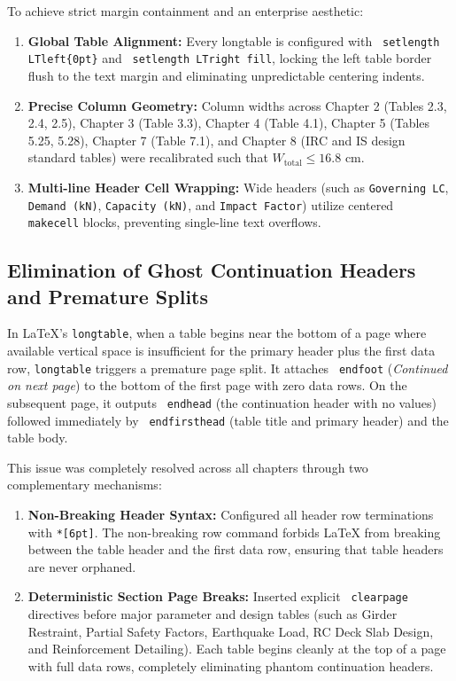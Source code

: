 \documentclass[12pt,a4paper]{article}
\begin{document}
To achieve strict margin containment and an enterprise aesthetic:
\begin{enumerate}
  \item \textbf{Global Table Alignment:} Every longtable is configured with \texttt{ setlength LTleft\{0pt\}} and \texttt{ setlength LTright fill}, locking the left table border flush to the text margin and eliminating unpredictable centering indents.
  \item \textbf{Precise Column Geometry:} Column widths across Chapter 2 (Tables 2.3, 2.4, 2.5), Chapter 3 (Table 3.3), Chapter 4 (Table 4.1), Chapter 5 (Tables 5.25, 5.28), Chapter 7 (Table 7.1), and Chapter 8 (IRC and IS design standard tables) were recalibrated such that $W_{\text{total}} \le 16.8\text{ cm}$.
  \item \textbf{Multi-line Header Cell Wrapping:} Wide headers (such as \texttt{Governing LC}, \texttt{Demand (kN)}, \texttt{Capacity (kN)}, and \texttt{Impact Factor}) utilize centered \texttt{ makecell} blocks, preventing single-line text overflows.
\end{enumerate}

\subsection{Elimination of Ghost Continuation Headers and Premature Splits}
In LaTeX's \texttt{longtable}, when a table begins near the bottom of a page where available vertical space is insufficient for the primary header plus the first data row, \texttt{longtable} triggers a premature page split. It attaches \texttt{ endfoot} (\textit{Continued on next page}) to the bottom of the first page with zero data rows. On the subsequent page, it outputs \texttt{ endhead} (the continuation header with no values) followed immediately by \texttt{ endfirsthead} (table title and primary header) and the table body.

This issue was completely resolved across all chapters through two complementary mechanisms:
\begin{enumerate}
  \item \textbf{Non-Breaking Header Syntax:} Configured all header row terminations with \texttt{*[6pt]}. The non-breaking row command forbids LaTeX from breaking between the table header and the first data row, ensuring that table headers are never orphaned.
  \item \textbf{Deterministic Section Page Breaks:} Inserted explicit \texttt{ clearpage} directives before major parameter and design tables (such as Girder Restraint, Partial Safety Factors, Earthquake Load, RC Deck Slab Design, and Reinforcement Detailing). Each table begins cleanly at the top of a page with full data rows, completely eliminating phantom continuation headers.
\end{enumerate}
\end{document}
